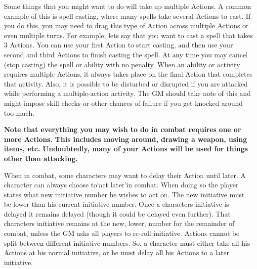 \documentclass[twoside]{book}
\begin{document}
    {  
    Some things that you might want to do will take up multiple Actions. A common example of this is spell casting, where many spells take several Actions to cast. If you do this, you may need to drag this type of Action across multiple Actions or even multiple turns. For example, lets say that you want to cast a spell that takes 3 Actions. You can use your first Action to start casting, and then use your second and third Actions to finish casting the spell. At any time you may cancel (stop casting) the spell or ability with no penalty. When an ability or activity requires multiple Actions, it always takes place on the final Action that completes that activity. Also, it is possible to be disturbed or disrupted if you are attacked while performing a multiple-action activity. The GM should take note of this and might impose skill checks or other chances of failure if you get knocked around too much.
    }
  

 \textbf{Note that everything you may wish to do in combat requires one or more Actions. This includes moving around, drawing a weapon, using items, etc. Undoubtedly, many of your Actions will be used for things other than attacking.}


    {  
    When in combat, some characters may want to delay their Action until later. A character can always choose to`act later'in combat. When doing so the player states what new initiative number he wishes to act on. The new initiative must be lower than his current initiative number. Once a characters initiative is delayed it remains delayed (though it could be delayed even further). That characters initiative remains at the new, lower, number for the remainder of combat, unless the GM asks all players to re-roll initiative. Actions cannot be split between different initiative numbers. So, a character must either take all his Actions at his normal initiative, or he must delay all his Actions to a later initiative.
    }
  
  

  
\end{document}
